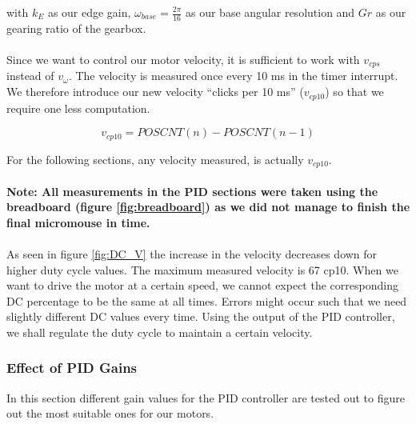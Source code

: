 with $k_E$ as our edge gain, $\omega_{base} = \frac{2\pi}{16}$ as our base angular resolution and $Gr$ as our gearing ratio of the gearbox.
\\\\
Since we want to control our motor velocity, it is sufficient to work with $v_{cps}$ instead of $v_{\omega}$. 
The velocity is measured once every 10 ms in the timer interrupt.
We therefore introduce our new velocity ``clicks per 10 ms'' ($v_{cp10}$) so that we require one less computation.

$$v_{cp10} = POSCNT(n) - POSCNT(n-1)$$

For the following sections, any velocity measured, is actually $v_{cp10}$.
\\\\
\textbf{Note: All measurements in the PID sections were taken using the breadboard (figure \ref{fig:breadboard}) as we did not manage to finish the final micromouse in time.}
\\\\
As seen in figure \ref{fig:DC_V} the increase in the velocity decreases down for higher duty cycle values. The maximum measured velocity is 67 cp10. When we want to drive the motor at a certain speed, we cannot expect the corresponding DC percentage to be the same at all times. Errors might occur such that we need slightly different DC values every time.
Using the output of the PID controller, we shall regulate the duty cycle to maintain a certain velocity.

\subsubsection{Effect of PID Gains}
In this section different gain values for the PID controller are tested out to figure out the most suitable ones for our motors.
